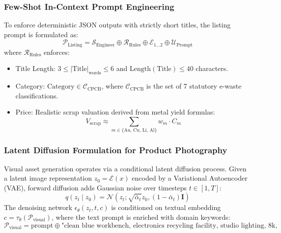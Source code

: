 \documentclass[12pt,a4paper]{article}
\begin{document}
\subsubsection{Few-Shot In-Context Prompt Engineering}
To enforce deterministic JSON outputs with strictly short titles, the listing prompt is formulated as:
\begin{equation}
\mathcal{P}_{\text{Listing}} = \mathcal{S}_{\text{Engineer}} \oplus \mathcal{R}_{\text{Rules}} \oplus \mathcal{E}_{1 \dots 2} \oplus \mathcal{U}_{\text{Prompt}}
\end{equation}
where $\mathcal{R}_{\text{Rules}}$ enforces:
\begin{itemize}
    \item Title Length: $3 \le |\text{Title}|_{\text{words}} \le 6$ and $\text{Length}(\text{Title}) \le 40$ characters.
    \item Category: $\text{Category} \in \mathcal{C}_{\text{CPCB}}$, where $\mathcal{C}_{\text{CPCB}}$ is the set of 7 statutory e-waste classifications.
    \item Price: Realistic scrap valuation derived from metal yield formulas:
    \begin{equation}
    V_{\text{scrap}} \approx \sum_{m \in \{\text{Au, Cu, Li, Al}\}} w_m \cdot C_m
    \end{equation}
\end{itemize}

\subsubsection{Latent Diffusion Formulation for Product Photography}
Visual asset generation operates via a conditional latent diffusion process. Given a latent image representation $z_0 = \mathcal{E}(x)$ encoded by a Variational Autoencoder (VAE), forward diffusion adds Gaussian noise over timesteps $t \in [1, T]$:
\begin{equation}
q(z_t \mid z_0) = \mathcal{N}\left(z_t; \sqrt{\bar{\alpha}_t}z_0, (1 - \bar{\alpha}_t)\mathbf{I}\right)
\end{equation}
The denoising network $\epsilon_\theta(z_t, t, c)$ is conditioned on textual embedding $c = \tau_\theta(\mathcal{P}_{\text{visual}})$, where the text prompt is enriched with domain keywords:
\begin{equation}
\mathcal{P}_{\text{visual}} = \text{prompt} \oplus \text{"clean blue workbench, electronics recycling facility, studio lighting, 8k, photorealistic"}
\end{equation}
\end{document}
